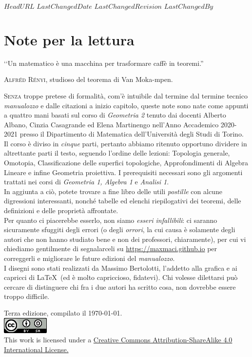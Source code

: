 \svnidlong
{$HeadURL$}
{$LastChangedDate$}
{$LastChangedRevision$}
{$LastChangedBy$}

\chapter*{Note per la lettura}

\begin{introduction}
‘‘Un matematico è una macchina per trasformare caffè in teoremi.''
\begin{flushright}
	\textsc{Alfréd Rényi,} studioso del teorema di Van Moka-mpen.
\end{flushright}
\end{introduction}

\lettrine[findent=1pt, nindent=0pt]{S}{enza} troppe pretese di formalità, com'è intuibile dal termine dal termine tecnico \textit{manualozzo} e dalle citazioni a inizio capitolo, queste note sono nate come appunti a quattro mani basati sul corso di \textit{Geometria 2} tenuto dai docenti Alberto Albano, Cinzia Casagrande ed Elena Martinengo nell'Anno Accademico 2020-2021 presso il Dipartimento di Matematica dell'Università degli Studi di Torino.\\
Il corso è diviso in \textit{cinque} parti, pertanto abbiamo ritenuto opportuno dividere in altrettante parti il testo, seguendo l'ordine delle lezioni: Topologia generale, Omotopia, Classificazione delle superfici topologiche, Approfondimenti di Algebra Lineare e infine Geometria proiettiva. I prerequisiti necessari sono gli argomenti trattati nei corsi di \textit{Geometria 1, Algebra 1} e \textit{Analisi 1}.\\
In aggiunta a ciò, potete trovare a fine libro delle utili \textit{postille} con alcune digressioni interessanti, nonché tabelle ed elenchi riepilogativi dei teoremi, delle definizioni e delle proprietà affrontate.\\
Per quanto ci piacerebbe esserlo, non siamo \textit{esseri infallibili}: ci saranno sicuramente sfuggiti degli errori (o degli \textit{orrori}, la cui causa è solamente degli autori che non hanno studiato bene e non dei professori, chiaramente), per cui vi chiediamo gentilmente di segnalarceli su \textcolor{reddo}{\url{https://maxmaci.github.io}} per correggerli e migliorare le future edizioni del \textit{manualozzo}.\\
I disegni sono stati realizzati da Massimo Bertolotti, l'addetto alla grafica e ai capricci di \LaTeX\ (ed è molto capriccioso, fidatevi). Chi volesse dilettarsi può cercare di distinguere chi fra i due autori ha scritto cosa, non dovrebbe essere troppo difficile.
\vfill
\begin{center}
	Terza edizione, compilato il \today.\\
			\includegraphics[trim=0cm 0cm 0cm 0cm,clip,scale=0.5]{images/88x31.png}\\
	{\footnotesize This work is licensed under a \href{https://creativecommons.org/licenses/by-sa/4.0/}{Creative Commons Attribution-ShareAlike 4.0 International License.}}
\end{center}